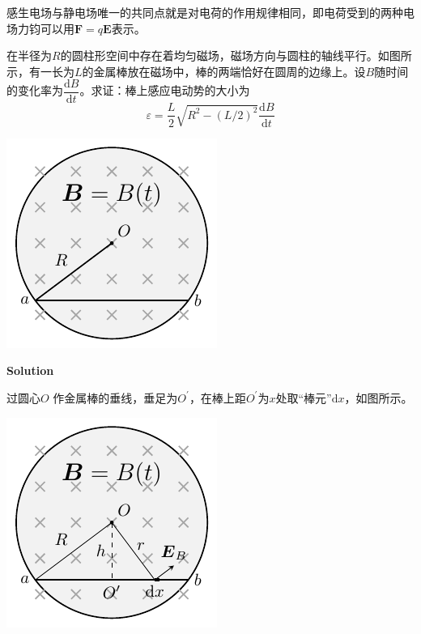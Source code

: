 \documentclass[
	12pt, %
	a4paper, %
]{myLegrandOrangeBook}
\newcommand{\rmd}{\mathrm{d}}
\newcommand{\deriv}[2]{\frac{\rmd #1}{\rmd #2}}
\newcommand{\dderiv}[2]{\dfrac{\rmd #1}{\rmd #2}}
\begin{document}
感生电场与静电场唯一的共同点就是对电荷的作用规律相同，即电荷受到的两种电场力钧可以用\(\boldsymbol{F} = q \boldsymbol{E}\)表示。

\begin{exercise}
    在半径为\(R\)的圆柱形空间中存在着均匀磁场，磁场方向与圆柱的轴线平行。如图所示，有一长为\(L\)的金属棒放在磁场中，棒的两端恰好在圆周的边缘上。设\(B\)随时间的变化率为\(\dderiv{B}{t}\)。求证：棒上感应电动势的大小为
    \begin{equation*}
        \varepsilon=\frac{L}{2} \sqrt{R^2-(L / 2)^2} \deriv{B}{t}
    \end{equation*}

    \begin{center}
        \includegraphics[width=.25\textwidth]{graphics/感生电动势题图.pdf}
    \end{center}
\end{exercise}

    \textbf{Solution}
    \vspace{1em}

过圆心\(O\) 作金属棒的垂线，垂足为\(O^\prime\)，在棒上距\(O^\prime\)为\(x\)处取“棒元”\(\rmd x\)，如图所示。

\begin{center}
    \includegraphics[width=.25\textwidth]{graphics/感生电动势解图.pdf}
\end{center}
\end{document}
